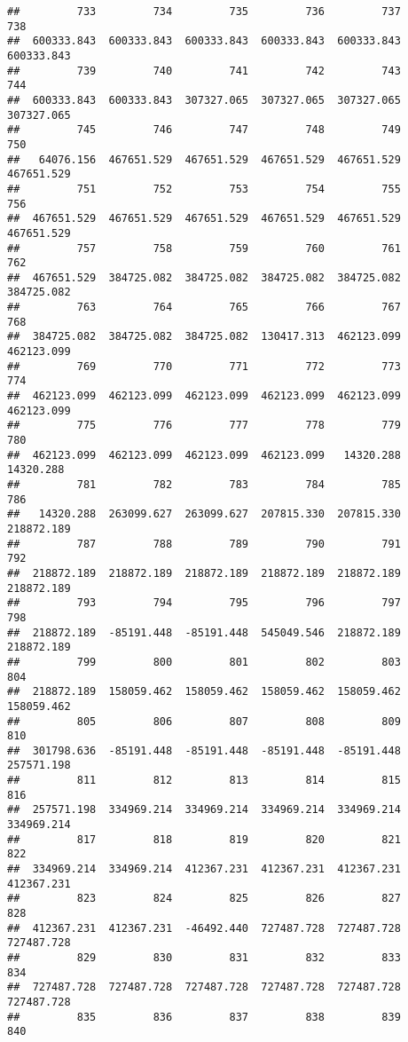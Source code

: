 \documentclass[
]{book}
\begin{document}
\begin{verbatim}
##         733         734         735         736         737         738 
##  600333.843  600333.843  600333.843  600333.843  600333.843  600333.843 
##         739         740         741         742         743         744 
##  600333.843  600333.843  307327.065  307327.065  307327.065  307327.065 
##         745         746         747         748         749         750 
##   64076.156  467651.529  467651.529  467651.529  467651.529  467651.529 
##         751         752         753         754         755         756 
##  467651.529  467651.529  467651.529  467651.529  467651.529  467651.529 
##         757         758         759         760         761         762 
##  467651.529  384725.082  384725.082  384725.082  384725.082  384725.082 
##         763         764         765         766         767         768 
##  384725.082  384725.082  384725.082  130417.313  462123.099  462123.099 
##         769         770         771         772         773         774 
##  462123.099  462123.099  462123.099  462123.099  462123.099  462123.099 
##         775         776         777         778         779         780 
##  462123.099  462123.099  462123.099  462123.099   14320.288   14320.288 
##         781         782         783         784         785         786 
##   14320.288  263099.627  263099.627  207815.330  207815.330  218872.189 
##         787         788         789         790         791         792 
##  218872.189  218872.189  218872.189  218872.189  218872.189  218872.189 
##         793         794         795         796         797         798 
##  218872.189  -85191.448  -85191.448  545049.546  218872.189  218872.189 
##         799         800         801         802         803         804 
##  218872.189  158059.462  158059.462  158059.462  158059.462  158059.462 
##         805         806         807         808         809         810 
##  301798.636  -85191.448  -85191.448  -85191.448  -85191.448  257571.198 
##         811         812         813         814         815         816 
##  257571.198  334969.214  334969.214  334969.214  334969.214  334969.214 
##         817         818         819         820         821         822 
##  334969.214  334969.214  412367.231  412367.231  412367.231  412367.231 
##         823         824         825         826         827         828 
##  412367.231  412367.231  -46492.440  727487.728  727487.728  727487.728 
##         829         830         831         832         833         834 
##  727487.728  727487.728  727487.728  727487.728  727487.728  727487.728 
##         835         836         837         838         839         840 

\end{verbatim}
\end{document}
